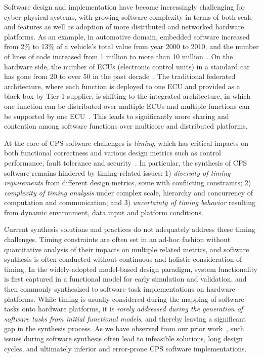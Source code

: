 
Software design and implementation have become increasingly challenging for cyber-physical systems, with growing software complexity in terms of both scale and features as well as adoption of more distributed and networked hardware platforms. As an example, in automotive domain, embedded software increased from 2\% to 13\% of a vehicle's total value from year 2000 to 2010, and the number of lines of code increased from 1 million to more than 10 million~\cite{QuoVadis, IEEESpectrumAuto}. On the hardware side, the number of ECUs (electronic control units) in a standard car has gone from 20 to over 50 in the past decade~\cite{IEEESpectrumAuto}. The traditional federated architecture, where each function is deployed to one ECU and provided as a black-box by Tier-1 supplier, is shifting to the integrated architecture, in which one function can be distributed over multiple ECUs and multiple functions can be supported by one ECU~\cite{DiNatale_IEEE10}. This leads to significantly more sharing and contention among software functions over multicore and distributed platforms.

At the core of CPS software challenges is \emph{timing}, which has critical impacts on both functional correctness and various design metrics such as control performance, fault tolerance and security~\cite{edward_11, ASV07Automotive, mueller_hcsp06}. In particular, the synthesis of CPS software remains hindered by timing-related issues: 1) \emph{diversity of timing requirements} from different design metrics, some with conflicting constraints; 2) \emph{complexity of timing analysis} under complex scale, hierarchy and concurrency of computation and communication; and 3) \emph{uncertainty of timing behavior} resulting from dynamic environment, data input and platform conditions. 

Current synthesis solutions and practices do not adequately address these timing challenges. Timing constraints are often set in an ad-hoc fashion without quantitative analysis of their impacts on multiple related metrics, and software synthesis is often conducted without continuous and holistic consideration of timing. In the widely-adopted model-based design paradigm, system functionality is first captured in a functional model for early simulation and validation, and then commonly synthesized to software task implementations on hardware platforms. While timing is usually considered during the mapping of software tasks onto hardware platforms, it is \emph{rarely addressed during the generation of software tasks from initial functional models}, and thereby leaving a significant gap in the synthesis process.  As we have observed from our prior work~\cite{Zheng_TCAD16, Deng_ICCPS15, Deng_SIES14, Zhu_DATE13, Guo_CODES14, Deng_TC16}, such issues during software synthesis often lead to infeasible solutions, long design cycles, and ultimately inferior and error-prone CPS software implementations.

